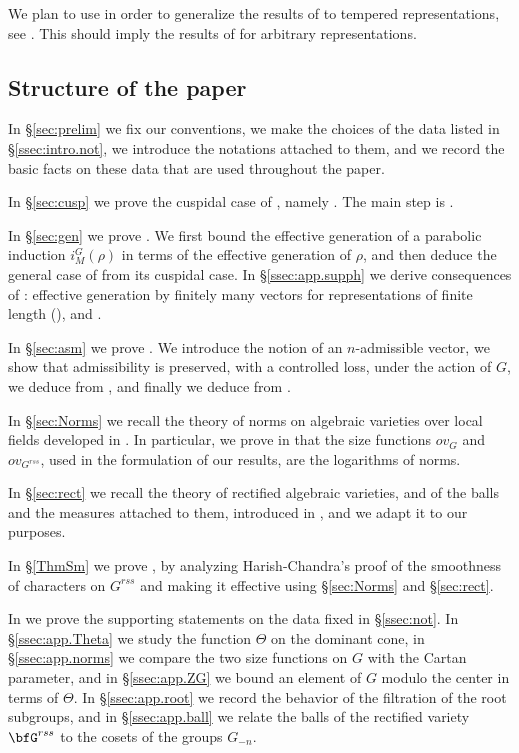 \documentclass[12pt,a4paper]{amsart}%
\newcommand{\Rami}[1]{{{#1}}}
\begin{document}
We plan to use \cite{AGKS_KY} in order to generalize the results of 
\cite{AGKS2,AAGKS} to tempered representations, see \cite{AGKS_int}.  This should imply the results \Rami{of 
\cite{AGKS2,AAGKS}} for arbitrary representations. 

\subsection{Structure of the paper}
In \S\ref{sec:prelim} we fix our conventions, we make the choices of the data listed in \S\ref{ssec:intro.not}, we introduce the notations attached to them, and we record the basic facts on these data that are used throughout the paper.

In \S\ref{sec:cusp} we prove the cuspidal case of , namely . The main step is .

In \S\ref{sec:gen} we prove . We first bound the effective generation of a parabolic induction $i_M^G(\rho)$ in terms of the effective generation of $\rho$, and then deduce the general case of  from its cuspidal case. In \S\ref{ssec:app.supph} we derive consequences of : effective generation by finitely many vectors for representations of finite length (), and .

In \S\ref{sec:asm} we prove . We introduce the notion of an $n$-admissible vector, we show that admissibility is preserved, with a controlled loss, under the action of $G$, we deduce  from , and finally we deduce  from .

In \S\ref{sec:Norms} we recall the theory of norms on algebraic varieties over local fields developed in \cite[\S18]{Kot}. In particular, we prove in  that the size functions $ov_G$ and $ov_{G^{rss}}$, used in the formulation of our results, are the logarithms of norms.

In \S\ref{sec:rect} we recall the theory of rectified algebraic varieties, and of the balls and the measures attached to them, introduced in \cite{AGKS0}, and we adapt it to our purposes.

In \S\ref{ThmSm} we prove , by analyzing Harish-Chandra's proof of the smoothness of characters on $G^{rss}$ and making it effective using \S\ref{sec:Norms} and \S\ref{sec:rect}.

In  we prove the supporting statements on the data fixed in \S\ref{ssec:not}. In \S\ref{ssec:app.Theta} we study the function $\Theta$ on the dominant cone, in \S\ref{ssec:app.norms} we compare the two size functions on $G$ with the Cartan parameter, and in \S\ref{ssec:app.ZG} we bound an element of $G$ modulo the center in terms of $\Theta$. In \S\ref{ssec:app.root} we record the behavior of the filtration of the root subgroups, and in \S\ref{ssec:app.ball} we relate the balls of the rectified variety $\bfG^{rss}$ to the cosets of the groups $G_{-n}$.
\end{document}
